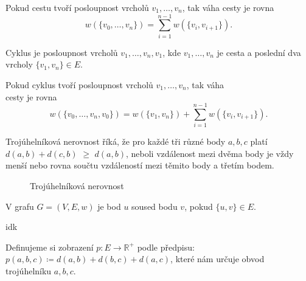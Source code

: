 \begin{definition}
    \label{definice:vaha_cesty}
    Pokud cestu tvoří posloupnost vrcholů $v_1, \ldots, v_n$, tak váha cesty je rovna \[ w(\{v_0,\dots ,v_n\}) = \sum_{i=1}^{n-1}w(\{v_i, v_{i+1}\}). \]
    
\end{definition}

\begin{definition}[Cyklus]
    \label{definice:cyklus}
    Cyklus je posloupnost vrcholů $v_1,\ldots,v_n,v_1$, kde $v_1,\ldots,v_n$ je cesta a poslední dva vrcholy $\{v_1,v_n\} \in E$.
\end{definition}

\begin{definition}
    \label{definice:vaha_cyklu}
    Pokud cyklus tvoří posloupnost vrcholů $v_1, \ldots, v_n$, tak váha \\cesty je rovna \[ w(\{v_0,\dots ,v_n, v_0\}) = w(\{v_1, v_n\}) + \sum_{i=1}^{n-1}w(\{v_i, v_{i+1}\}). \]
    
\end{definition}

\begin{definition}
    \label{definice:trojuhelnikova_nerovnost}
    Trojúhelníková nerovnost říká, že pro kaž\-dé tři různé body $a, b, c$ platí \textcolor{myblue}{$d(a, b)+d(c, b)$} $\geq$ \textcolor{myred}{$d(a,b)$}, neboli vzdálenost mezi dvěma body je vždy menší nebo rovna součtu vzdáleností mezi těmito body a třetím bodem. 

    \begin{figure}[h]
        \centering
        \caption{Trojúhelníková nerovnost}
    \end{figure}

\end{definition}
\begin{definition}[Soused]
    \label{definice:soused}
    V grafu $G = (V, E, w)$ je bod $u$ soused bodu $v$, pokud $\{u, v\} \in E$.
\end{definition}

\begin{definition}
    \label{definice:bigonotation}
    idk
\end{definition}

\begin{definition}
    \label{definice:obvod_troj}
    Definujeme si zobrazení $p: E\rightarrow \mathbb{R}^+$ podle předpisu: $p(a, b, c) \coloneqq d(a, b) + d(b, c) + d(a, c)$, které nám určuje obvod trojúhelníku $a, b, c$.
\end{definition}